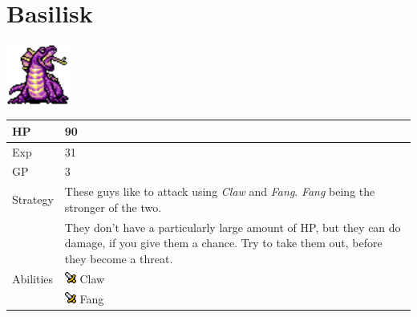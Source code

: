 \section{Basilisk}
\label{monster:basilisk}

\includegraphics[height=2cm,keepaspectratio]{./resources/monster/basilisk}

\begin{longtable}{ l p{9cm} }
	HP
	& 90
\\ \hline
	Exp
	& 31
\\ \hline
	GP
	& 3
\\ \hline
	Strategy
	& These guys like to attack using \textit{Claw} and \textit{Fang}. \textit{Fang} being the stronger of the two. \\
	& They don't have a particularly large amount of HP, but they can do damage, if you give them a chance. Try to take them out, before they become a threat.
\\ \hline
	Abilities
	& \includegraphics[height=1em,keepaspectratio]{./resources/effects/damage} Claw \\
	& \includegraphics[height=1em,keepaspectratio]{./resources/effects/damage} Fang
\end{longtable}
